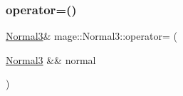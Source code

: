 \hypertarget{structmage_1_1_normal3_a74cd3988b2ee23a0a76a5f7d6d5d7f3f}{}\label{structmage_1_1_normal3_a74cd3988b2ee23a0a76a5f7d6d5d7f3f} 
\subsubsection{\texorpdfstring{operator=()}{operator=()}\hspace{0.1cm}{\footnotesize\ttfamily [2/2]}}
{\footnotesize\ttfamily \hyperlink{structmage_1_1_normal3}{Normal3}\& mage\+::\+Normal3\+::operator= (\begin{DoxyParamCaption}\item[{\hyperlink{structmage_1_1_normal3}{Normal3} \&\&}]{normal }\end{DoxyParamCaption})}

